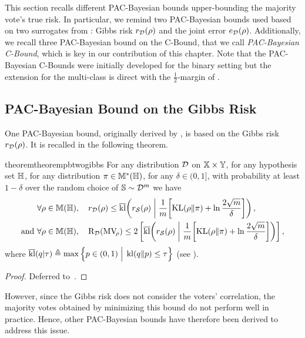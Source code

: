 This section recalls different PAC-Bayesian bounds upper-bounding the majority vote's true risk.
In particular, we remind two PAC-Bayesian bounds used based on two surrogates from : Gibbs risk $r_{\mathcal{D}}(\rho)$ and the joint error $e_{\mathcal{D}}(\rho)$.
Additionally, we recall three PAC-Bayesian bound on the C-Bound, that we call {\it PAC-Bayesian C-Bound}, which is key in our contribution of this chapter. 
Note that the PAC-Bayesian C-Bounds were initially developed for the binary setting but the extension for the multi-class is direct with the $\frac{1}{2}$-margin of \citet{LavioletteMorvantRalaivolaRoy2017}.

\subsection{PAC-Bayesian Bound on the Gibbs Risk}
\label{chap:mv:sec:gibbs}

One PAC-Bayesian bound, originally derived by \citet{GermainLacasseLavioletteMarchandRoy2015}, is based on the Gibbs risk $r_{\mathcal{D}}(\rho)$.
It is recalled in the following theorem.

\begin{restatable}{theorem}{theorempbtwogibbs}\label{chap:mv:theorem:pb-2gibbs}
 For any distribution $\mathcal{D}$ on $\mathbb{X}\times\mathbb{Y}$, for any hypothesis set $\mathbb{H}$, for any distribution $\pi\in\mathbb{M}^{*}(\mathbb{H})$, for any $\delta\in(0,1]$, with probability at least $1-\delta$ over the random choice of $\mathbb{S}\sim\mathcal{D}^m$ we have
\begin{align}
&\forall\rho\in\mathbb{M}(\mathbb{H}),\quad r_{\mathcal{D}}(\rho) \le \overline{\operatorname{kl}}\!\left( r_{\mathcal{S}}(\rho) \;\middle|\; \frac{1}{m}\!\left[\operatorname{KL}(\rho\|\pi)+\ln\frac{2\sqrt{m}}{\delta}\right]\right),\nonumber\\
\text{and}\ &\forall\rho\in\mathbb{M}(\mathbb{H}),\quad \text{R}_{\mathcal{D}}(\text{MV}_{\!\rho}) \le 2\left[ \overline{\operatorname{kl}}\!\left( r_{\mathcal{S}}(\rho) \;\middle|\; \frac{1}{m}\!\left[\operatorname{KL}(\rho\|\pi)+\ln\frac{2\sqrt{m}}{\delta}\right]\right) \right],\label{chap:mv:eq:pb-2gibbs}
\end{align}
where $\overline{\operatorname{kl}}(q | \tau)\triangleq\max\Big\{ p \in (0,1) \;\Big|\; \operatorname{kl}(q\|p) \le \tau\Big\}$ (see ).
\end{restatable}
\begin{noaddcontents}\begin{proof}
Deferred to~.
\end{proof}\end{noaddcontents}

However, since the Gibbs risk does not consider the voters' correlation, the majority votes obtained by minimizing this bound do not perform well in practice.
Hence, other PAC-Bayesian bounds have therefore been derived to address this issue.


